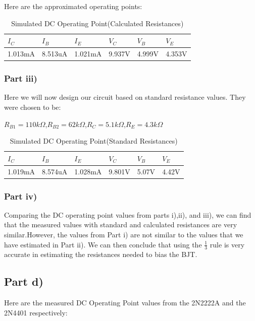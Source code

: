 \documentclass[12pt]{article}
\begin{document}
Here are the approximated operating points:
\begin{table}[h!]
\centering
\begin{tabular}{|l|l|l|l|l|l|}
\cline{1-6}
$I_C$      & $I_B$      & $I_E$      & $V_C$     & $V_B$     & $V_E$     \\ \cline{1-6}
\hline
1.013mA & 8.513uA & 1.021mA & 9.937V & 4.999V & 4.353V \\ 
\hline
\end{tabular}
\caption{Simulated DC Operating Point(Calculated Resistances)}
\label{table:DC Operating Values}
\end{table}
\subsubsection{Part iii)}
Here we will now design our circuit based on standard resistance values. They were chosen to be:
\begin{center}
    $R_{B1}=110k\Omega$,$R_{B2}=62k\Omega$,$R_{C}=5.1k\Omega$,$R_{E}=4.3k\Omega$
\end{center}
\begin{table}[h!]
\centering
\begin{tabular}{|l|l|l|l|l|l|}
\cline{1-6}
$I_C$      & $I_B$      & $I_E$      & $V_C$     & $V_B$     & $V_E$     \\ \cline{1-6}
\hline
1.019mA & 8.574uA & 1.028mA & 9.801V & 5.07V & 4.42V \\ 
\hline
\end{tabular}
\caption{Simulated DC Operating Point(Standard Resistances)}
\label{table:DC Standard Operating Values}
\end{table}
\subsubsection{Part iv)}
Comparing the DC operating point values from parts i),ii), and iii), we can find that the measured values with standard and calculated resistances are very similar.However, the values from Part i) are not similar to the values that we have estimated in Part ii). We can then conclude that using the $\frac{1}{3}$ rule is very accurate in estimating the resistances needed to bias the BJT.  
\subsection{Part d)}
\FloatBarrier
Here are the measured DC Operating Point values from the 2N2222A and the 2N4401 respectively:
\end{document}
